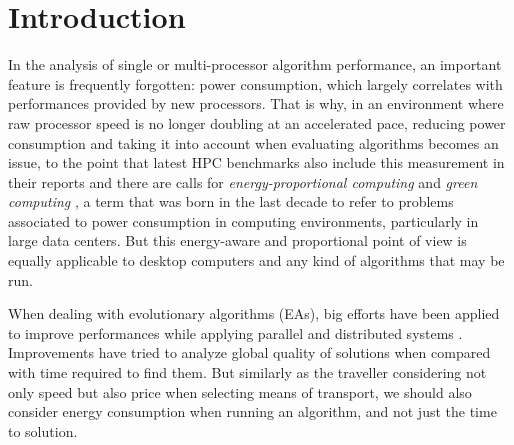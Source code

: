 \section{Introduction}


In the analysis of single or multi-processor algorithm performance, an
important feature 
is frequently forgotten:  power consumption, which largely correlates
with performances provided by new processors. That is why, in an
environment where raw processor speed is no longer doubling at an
accelerated pace, reducing power consumption and taking it into
account when evaluating algorithms becomes an issue, to the point that
latest HPC benchmarks also include this measurement in their reports
and there are calls for {\em energy-proportional computing}
\cite{barroso2007case} and 
\textit{green computing} \cite{green-computing}, a term that was born in the last decade to refer
to problems associated to power consumption in computing environments,
particularly in large data centers. But this
energy-aware and proportional point of view is equally applicable to desktop computers
and any kind of algorithms that may be run. 

When dealing with evolutionary algorithms (EAs), big efforts have been
applied to improve performances while applying parallel and
distributed systems \cite{paba}.  Improvements have tried to analyze
global quality of solutions when compared with time required to find
them.   
But similarly as the traveller considering not only speed but also
price when selecting means of transport, we should also consider
energy consumption when running an algorithm, and not just the time to
solution.  %

